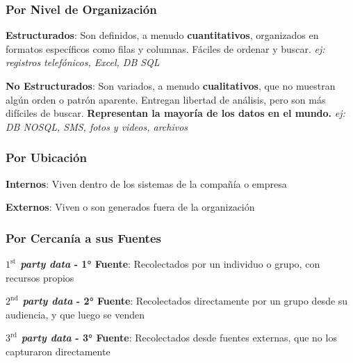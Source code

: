 \subsubsection{Por Nivel de Organización}
\begin{description}
    \item {\textbf{Estructurados}: Son definidos, a menudo \textbf{cuantitativos}, organizados en formatos específicos como filas y columnas. Fáciles de ordenar y buscar. \textit{ej: registros telefónicos, Excel, DB SQL}}
    \item {\textbf{No Estructurados}: Son variados, a menudo \textbf{cualitativos}, que no muestran algún orden o patrón aparente. Entregan libertad de análisis, pero son más difíciles de buscar. \textbf{Representan la mayoría de los datos en el mundo.} \textit{ej: DB NOSQL, SMS, fotos y videos, archivos}}
\end{description}

\subsubsection{Por Ubicación}
\begin{description}
    \item {\textbf{Internos}: Viven dentro de los sistemas de la compañía o empresa}
    \item {\textbf{Externos}: Viven o son generados fuera de la organización}
\end{description}

\subsubsection{Por Cercanía a sus Fuentes}
\begin{description}
    \item {\textbf{\textit{$1^{\text{st}}$ party data} - 1° Fuente}: Recolectados por un individuo o grupo, con recursos propios}
    \item {\textbf{\textit{$2^{\text{nd}}$ party data} - 2° Fuente}: Recolectados directamente por un grupo desde su audiencia, y que luego se venden}
    \item {\textbf{\textit{$3^{\text{rd}}$ party data} - 3° Fuente}: Recolectados desde fuentes externas, que no los capturaron directamente}
\end{description}

